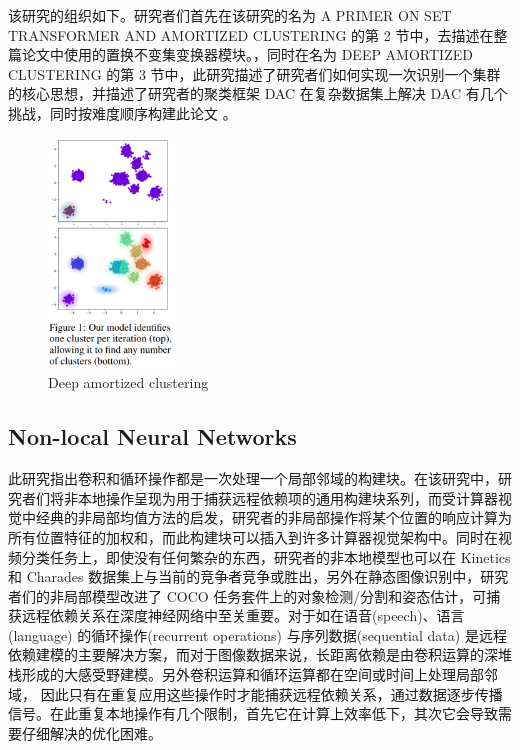 该研究的组织如下。研究者们首先在该研究的名为 A PRIMER ON SET TRANSFORMER AND AMORTIZED CLUSTERING 的第 2 节中，去描述在整篇论文中使用的置换不变集变换器模块。，同时在名为 DEEP AMORTIZED CLUSTERING 的第 3 节中，此研究描述了研究者们如何实现一次识别一个集群的核心思想，并描述了研究者的聚类框架 DAC 在复杂数据集上解决 DAC 有几个挑战，同时按难度顺序构建此论文 。

\begin{figure}[htb]
\centering 
\includegraphics[width=0.3\textwidth]{img/pa2.png} 
\caption{Deep amortized clustering}
\label{Test}
\end{figure}


\subsection{Non-local Neural Networks}

此研究指出卷积和循环操作都是一次处理一个局部邻域的构建块。在该研究中，研究者们将非本地操作呈现为用于捕获远程依赖项的通用构建块系列，而受计算器视觉中经典的非局部均值方法的启发，研究者的非局部操作将某个位置的响应计算为所有位置特征的加权和，而此构建块可以插入到许多计算器视觉架构中。同时在视频分类任务上，即使没有任何繁杂的东西，研究者的非本地模型也可以在 Kinetics 和 Charades 数据集上与当前的竞争者竞争或胜出，另外在静态图像识别中，研究者们的非局部模型改进了 COCO 任务套件上的对象检测/分割和姿态估计，可捕获远程依赖关系在深度神经网络中至关重要。对于如在语音(speech)、语言(language) 的循环操作(recurrent operations) 与序列数据(sequential data) 是远程依赖建模的主要解决方案，而对于图像数据来说，长距离依赖是由卷积运算的深堆栈形成的大感受野建模。另外卷积运算和循环运算都在空间或时间上处理局部邻域， 因此只有在重复应用这些操作时才能捕获远程依赖关系，通过数据逐步传播信号。在此重复本地操作有几个限制，首先它在计算上效率低下，其次它会导致需要仔细解决的优化困难。


